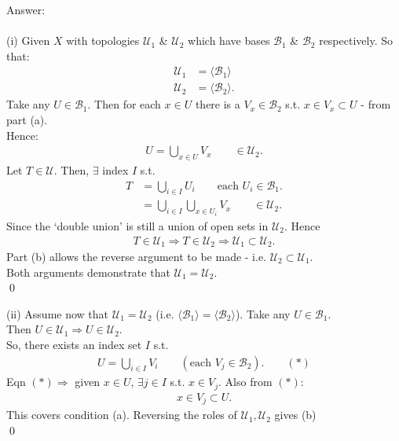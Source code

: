 \documentclass[12pt]{article}
\begin{document}
\vspace{1cm}
\noindent
Answer:\\
\\
(i) Given $X$ with topologies $\mathcal{U}_1$ \& $\mathcal{U}_2$ which have bases $\mathcal{B}_1$ \& $\mathcal{B}_2$ respectively. So that:
\begin{align*}
\mathcal{U}_1&=\langle\mathcal{B}_1\rangle\\
\mathcal{U}_2&=\langle\mathcal{B}_2\rangle.
\end{align*}
Take any $U\in\mathcal{B}_1$. Then for each $x\in U$ there is a $V_x\in\mathcal{B}_2$ s.t. $x\in V_x\subset U$ - from part (a).\\
Hence:
\begin{align*}
U=\bigcup_{x\in U}V_x\qquad\in\mathcal{U}_2.
\end{align*}
Let $T\in\mathcal{U}$. Then, $\exists$ index $I$ s.t.
\begin{align*}
T&=\bigcup_{i\in I}U_i\qquad\text{each }U_i\in\mathcal{B}_1.\\
&=\bigcup_{i\in I}\bigcup_{x\in U_i}V_x\qquad\in\mathcal{U}_2.
\end{align*}
Since the `double union' is still a union of open sets in $\mathcal{U}_2$. Hence
\begin{align*}
T\in\mathcal{U}_1\Rightarrow T\in\mathcal{U}_2\Rightarrow\mathcal{U}_1\subset\mathcal{U}_2.
\end{align*}
Part (b) allows the reverse argument to be made - i.e. $\mathcal{U}_2\subset\mathcal{U}_1$.\\
Both arguments demonstrate that $\mathcal{U}_1=\mathcal{U}_2$.\\
\qed

\newpage
\noindent
(ii) Assume now that $\mathcal{U}_1=\mathcal{U}_2$ (i.e. $\langle\mathcal{B}_1\rangle=\langle\mathcal{B}_2\rangle$).
Take any $U\in\mathcal{B}_1$.\\
Then $U\in\mathcal{U}_1\Rightarrow U\in\mathcal{U}_2$.\\
So, there exists an index set $I$ s.t.
\begin{align*}
U=\bigcup_{i\in I}V_i\qquad(\text{each }V_j\in\mathcal{B}_2).\qquad(*)
\end{align*}
Eqn $(*)\Rightarrow$ given $x\in U$, $\exists j\in I$ s.t. $x\in V_j$.
Also from $(*)$:
\begin{align*}
x\in V_j\subset U.
\end{align*}
This covers condition (a).
Reversing the roles of $\mathcal{U}_1,\mathcal{U}_2$ gives (b)\\
\qed
\end{document}
